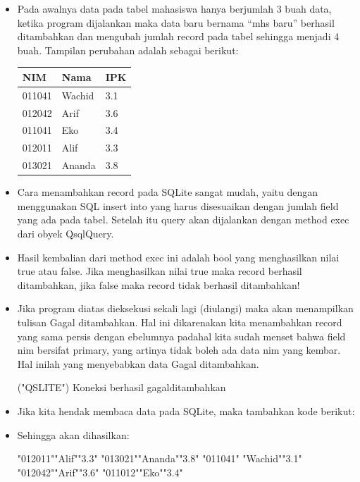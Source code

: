 \begin{itemize}
\item
Pada awalnya data pada tabel mahasiswa hanya berjumlah 3 buah data,
ketika program dijalankan maka data baru bernama ``mhs baru'' berhasil
ditambahkan dan mengubah jumlah record pada tabel sehingga menjadi 4
buah. Tampilan perubahan adalah sebagai berikut:

\begin{tabular}{|l|l|l|}
\hline
NIM & Nama & IPK \\ \hline
011041 & Wachid & 3.1 \\ \hline
012042 & Arif & 3.6 \\ \hline
011041 & Eko & 3.4 \\ \hline
012011 & Alif & 3.3 \\ \hline
013021 & Ananda & 3.8 \\ \hline

\end{tabular}
\item
Cara menambahkan record pada SQLite sangat mudah, yaitu dengan
menggunakan SQL insert into yang harus disesuaikan dengan jumlah field
yang ada pada tabel. Setelah itu query akan dijalankan dengan method
exec dari obyek QsqlQuery.
\item
Hasil kembalian dari method exec ini adalah bool yang menghasilkan
nilai true atau false. Jika menghasilkan nilai true maka record
berhasil ditambahkan, jika false maka record tidak berhasil
ditambahkan!
\item
Jika program diatas dieksekusi sekali lagi (diulangi) maka akan
menampilkan tulisan Gagal ditambahkan. Hal ini dikarenakan kita
menambahkan record yang sama persis dengan ebelumnya padahal kita
sudah menset bahwa field nim bersifat primary, yang artinya tidak
boleh ada data nim yang kembar. Hal inilah yang menyebabkan data Gagal
ditambahkan.
\begin{lcverbatim}
("QSLITE")
Koneksi berhasil
gagalditambahkan
\end{lcverbatim}

\item Jika kita hendak membaca data pada SQLite, maka tambahkan kode berikut:



\item Sehingga akan dihasilkan:

\begin{lcverbatim}
"012011""Alif""3.3"
"013021""Ananda""3.8"
"011041" "Wachid""3.1"
"012042""Arif""3.6"
"011012""Eko""3.4"

\end{lcverbatim}
\end{itemize}



